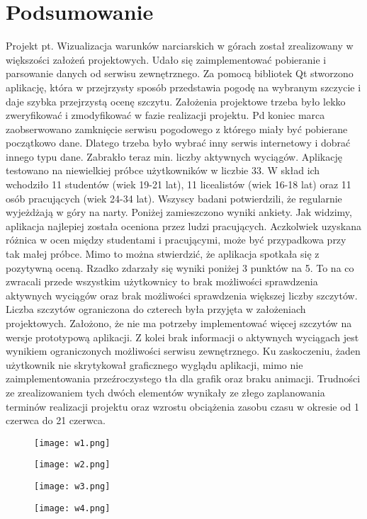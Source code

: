 \documentclass[10pt, a4paper]{article}
\begin{document}
\section{Podsumowanie} 
Projekt pt. Wizualizacja warunków narciarskich w górach został zrealizowany w większości założeń projektowych. Udało się zaimplementować pobieranie i parsowanie danych od serwisu zewnętrznego. Za pomocą bibliotek Qt stworzono aplikację, która w przejrzysty sposób przedstawia pogodę na wybranym szczycie i daje szybka przejrzystą ocenę szczytu. Założenia projektowe trzeba było lekko zweryfikować i zmodyfikować w fazie realizacji projektu. Pd koniec marca zaobserwowano zamknięcie serwisu pogodowego z którego miały być pobierane początkowo dane. Dlatego trzeba było wybrać inny serwis internetowy i dobrać innego typu dane. Zabrakło teraz min. liczby aktywnych wyciągów. Aplikację testowano na niewielkiej próbce użytkowników w liczbie 33. W skład ich wchodziło 11 studentów (wiek 19-21 lat), 11 licealistów (wiek 16-18 lat) oraz 11 osób pracujących (wiek 24-34 lat). Wszyscy badani potwierdzili, że regularnie wyjeżdżają w góry na narty. Poniżej zamieszczono wyniki ankiety. Jak widzimy, aplikacja najlepiej została oceniona przez ludzi pracujących. Aczkolwiek uzyskana różnica w ocen między studentami i pracującymi, może być przypadkowa przy tak małej próbce. Mimo to można stwierdzić, że aplikacja spotkała się z pozytywną oceną. Rzadko zdarzały się wyniki poniżej 3 punktów na 5. To na co zwracali przede wszystkim użytkownicy to brak możliwości sprawdzenia aktywnych wyciągów oraz brak możliwości sprawdzenia większej liczby szczytów. Liczba szczytów ograniczona do czterech była przyjęta w założeniach projektowych. Założono, że nie ma potrzeby implementować więcej szczytów na wersje prototypową aplikacji. Z kolei brak informacji o aktywnych wyciągach jest wynikiem ograniczonych możliwości serwisu zewnętrznego. Ku zaskoczeniu, żaden użytkownik nie skrytykował graficznego wyglądu aplikacji, mimo nie zaimplementowania przeźroczystego tła dla grafik oraz braku animacji. Trudności ze zrealizowaniem tych dwóch elementów wynikały ze złego zaplanowania terminów realizacji projektu oraz wzrostu obciążenia zasobu czasu w okresie od 1 czerwca do 21 czerwca. 
	\begin{figure}[!h]
	\centering
	\texttt{[image: w1.png]}
	
	\end{figure}
		\begin{figure}[!h]
	\centering
	\texttt{[image: w2.png]}

	\end{figure}
	\begin{figure}[!h]
	\centering
	\texttt{[image: w3.png]}
	
	\end{figure}
	\begin{figure}[!h]
	\centering
	\texttt{[image: w4.png]}

	\end{figure}



\end{document}
